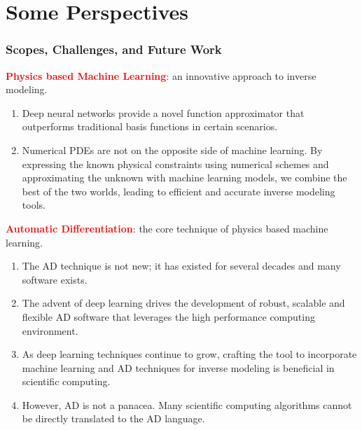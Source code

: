 \documentclass[usenames,dvipsnames]{beamer}
\begin{document}
\section{Some Perspectives}

\begin{frame}
	\frametitle{Scopes, Challenges, and Future Work}
	\textcolor{red}{\textbf{Physics based Machine Learning}}: an innovative approach to inverse modeling. 
	{\scriptsize
	\begin{enumerate}
		\item Deep neural networks provide a novel function approximator that outperforms traditional basis functions in certain scenarios. 
		\item Numerical PDEs are not on the opposite side of machine learning. By expressing the known physical constraints using numerical schemes and approximating the unknown with machine learning models, we combine the best of the two worlds, leading to efficient and accurate inverse modeling tools. 
	\end{enumerate}
	}
		
		\textcolor{red}{\textbf{Automatic Differentiation}}: the core technique of physics based machine learning.
		{\scriptsize
		\begin{enumerate}
		\item The AD technique is not new; it has existed for several decades and many software exists. 
		\item The advent of deep learning drives the development of robust, scalable and flexible AD software that leverages the high performance computing environment. 
		\item As deep learning techniques continue to grow, crafting the tool to incorporate machine learning and AD techniques for inverse modeling is beneficial in scientific computing.
		\item However, AD is not a panacea. Many scientific computing algorithms cannot be directly translated to the AD language. 
	\end{enumerate}
	}
	
\end{frame}
\end{document}
